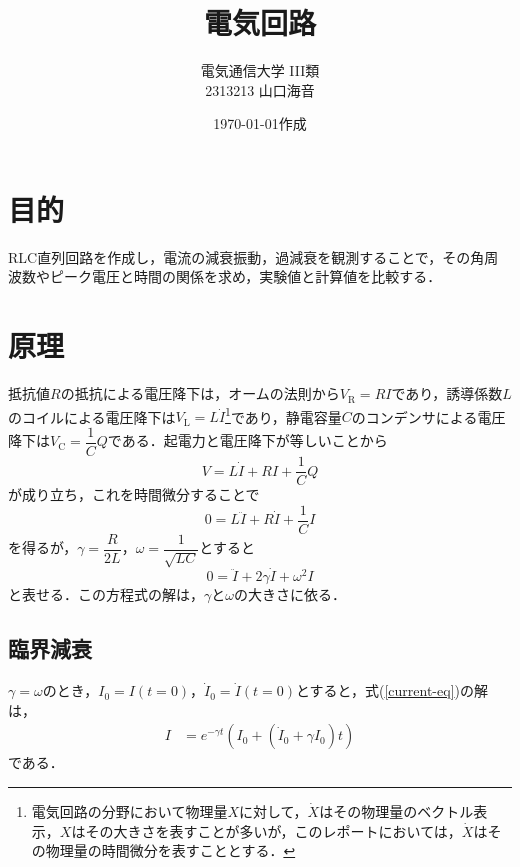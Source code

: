\documentclass[uplatex,dvipdfmx,a4paper,10pt]{jsarticle}
\title{電気回路}
\author{電気通信大学 I\hspace{-1.2pt}I\hspace{-1.2pt}I類\\
2313213 山口海音}
\date{\today 作成}
\begin{document}
\maketitle

\section{目的}
RLC直列回路を作成し，電流の減衰振動，過減衰を観測することで，その角周波数やピーク電圧と時間の関係を求め，実験値と計算値を比較する．

\section{原理}

抵抗値$R$の抵抗による電圧降下は，オームの法則から$V_\mathrm{R} = RI$であり，誘導係数$L$のコイルによる電圧降下は$V_\mathrm{L} = L\dot{I}$\footnote{電気回路の分野において物理量$X$に対して，$\dot{X}$はその物理量のベクトル表示，$X$はその大きさを表すことが多いが，このレポートにおいては，$\dot{X}$はその物理量の時間微分を表すこととする．}であり，静電容量$C$のコンデンサによる電圧降下は$V_\mathrm{C} = \dfrac{1}{C}Q$である．起電力と電圧降下が等しいことから
\begin{equation}
    V = L\dot{I} + RI + \frac{1}{C}Q
\end{equation}
が成り立ち，これを時間微分することで
\begin{equation}
    0 = L\ddot{I} + R\dot{I} + \frac{1}{C}I
\end{equation}
を得るが，$\gamma=\dfrac{R}{2L}$，$\omega=\dfrac{1}{\sqrt{LC}}$とすると
\begin{equation}\label{current-eq}
    0 = \ddot{I} + 2\gamma \dot{I} + \omega^2I
\end{equation}
と表せる．この方程式の解は，$\gamma$と$\omega$の大きさに依る．

\subsection{臨界減衰}\label{sec:LD}
$\gamma = \omega$のとき，$I_0=I(t=0)$，$\dot{I}_0=\dot{I}(t=0)$とすると，式(\ref{current-eq})の解は，
\begin{align}
    I &= e^{-\gamma t}\left( I_0 + \left( \dot{I}_0+\gamma I_0 \right)t\right)
\end{align}
である．
\end{document}
